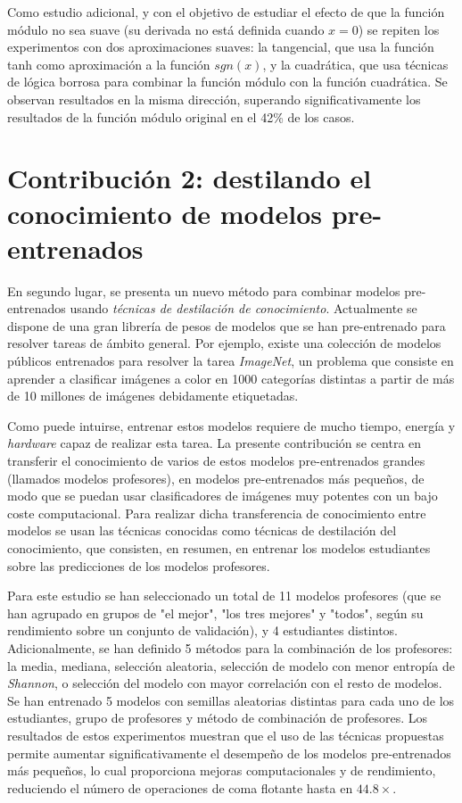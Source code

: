 \documentclass[10pt,a4paper,titlepage,table]{report}
\begin{document}
Como estudio adicional, y con el objetivo de estudiar el efecto de que la función módulo no sea suave (su derivada no está definida cuando $x=0$) se repiten los experimentos con dos aproximaciones suaves: la tangencial, que usa la función tanh como aproximación a la función $sgn(x)$, y la cuadrática, que usa técnicas de lógica borrosa para combinar la función módulo con la función cuadrática. Se observan resultados en la misma dirección, superando significativamente los resultados de la función módulo original en el 42\% de los casos.

\section*{Contribución 2: destilando el conocimiento de modelos pre-entrenados}
En segundo lugar, se presenta un nuevo método para combinar modelos pre-entrenados usando \textit{técnicas de destilación de conocimiento}. Actualmente se dispone de una gran librería de pesos de modelos que se han pre-entrenado para resolver tareas de ámbito general. Por ejemplo, existe una colección de modelos públicos entrenados para resolver la tarea \textit{ImageNet}, un problema que consiste en aprender a clasificar imágenes a color en 1000 categorías distintas a partir de más de 10 millones de imágenes debidamente etiquetadas. 

Como puede intuirse, entrenar estos modelos requiere de mucho tiempo, energía y \textit{hardware} capaz de realizar esta tarea. La presente contribución se centra en transferir el conocimiento de varios de estos modelos pre-entrenados grandes (llamados modelos profesores), en modelos pre-entrenados más pequeños, de modo que se puedan usar clasificadores de imágenes muy potentes con un bajo coste computacional. Para realizar dicha transferencia de conocimiento entre modelos se usan las técnicas conocidas como técnicas de destilación del conocimiento, que consisten, en resumen, en entrenar los modelos estudiantes sobre las predicciones de los modelos profesores.

Para este estudio se han seleccionado un total de 11 modelos profesores (que se han agrupado en grupos de "el mejor", "los tres mejores" y "todos", según su rendimiento sobre un conjunto de validación), y 4 estudiantes distintos. Adicionalmente, se han definido 5 métodos para la combinación de los profesores: la media, mediana, selección aleatoria, selección de modelo con menor entropía de \textit{Shannon}, o selección del modelo con mayor correlación con el resto de modelos. Se han entrenado 5 modelos con semillas aleatorias distintas para cada uno de los estudiantes, grupo de profesores y método de combinación de profesores. Los resultados de estos experimentos muestran que el uso de las técnicas propuestas permite aumentar significativamente el desempeño de los modelos pre-entrenados más pequeños, lo cual proporciona mejoras computacionales y de rendimiento, reduciendo el número de operaciones de coma flotante hasta en $44.8\times$. 
\end{document}
